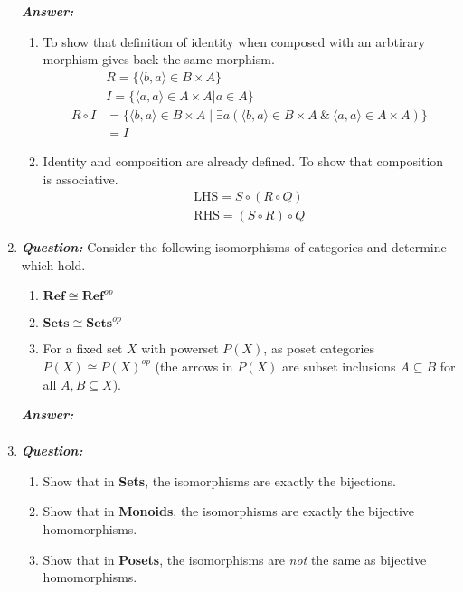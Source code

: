 \documentclass{article}
\begin{document}
\begin{enumerate}
	      \textbf{\textit{Answer:}}
	      \begin{enumerate}
		      \item To show that definition of identity  when composed with an arbtirary morphism gives back the same morphism.
		            \begin{align*}
			                      & R = \{\langle b,a \rangle \in B \times A \}                                                                                                \\
			                      & I = \{\langle a,a \rangle \in A \times A | a \in A\}                                                                                       \\
			            R \circ I & = \{ \langle b, a \rangle \in B \times A  \mid \exists a ( \langle b,a \rangle \in B \times A \ \& \ \langle a,a \rangle \in A \times A)\} \\
			                      & = I
		            \end{align*}
		      \item
		            Identity and composition are already defined. To show that composition is associative.
		            \begin{align*}
			            \text{LHS} = S \circ ( R \circ Q) \\
			            \text{RHS} = (S \circ  R ) \circ Q
		            \end{align*}
	      \end{enumerate}

	\item
	      \textbf{\textit{Question:}} Consider the following isomorphisms of categories and determine which hold.
	      \begin{enumerate}
		      \item  $\textbf{Ref} \cong \textbf{Ref}^{op}$
		      \item  $\textbf{Sets} \cong \textbf{Sets}^{op}$
		      \item  For a fixed set $X$ with powerset $P(X)$, as poset categories $P(X) \cong P(X)^{op}$ (the arrows in $P(X)$ are subset inclusions $ A \subseteq B$ for all $A,B \subseteq X$).
	      \end{enumerate}


	      \textbf{\textit{Answer:}}
	      \begin{align*}
	      \end{align*}


	\item
	      \textbf{\textit{Question:}}
	      \begin{enumerate}
		      \item  Show that in \textbf{Sets}, the isomorphisms are exactly the bijections.
		      \item  Show that in \textbf{Monoids}, the isomorphisms are exactly the bijective homomorphisms.
		      \item  Show that in \textbf{Posets}, the isomorphisms are \textit{not} the same as bijective homomorphisms.


\end{enumerate}
\end{enumerate}
\end{document}
